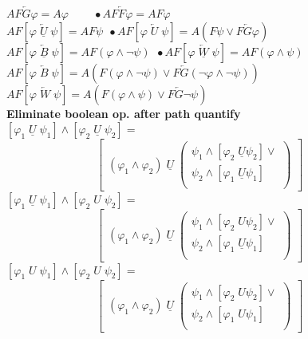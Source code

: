 \documentclass{article}
\begin{document}
\begin{multicols}{4}
$ A F \overleftarrow{G} \varphi  = A \varphi\ \ \ \ \ \ \ \ \ \ \bullet A F \overleftarrow{F} \varphi = AF \varphi $\\
$ A F[\varphi \; \underline{\overleftarrow{U}}\; \psi] = AF \psi\ \ \bullet A F[\varphi \; \overleftarrow{U}\; \psi] = A( F \psi \vee  F \overleftarrow{G} \varphi )$\\
$ A F[\varphi \; \underline{\overleftarrow{B}}\; \psi] = AF(\varphi \wedge \neg \psi)\ \ \bullet A F[\varphi \; \underline{\overleftarrow{W}}\; \psi] = AF(\varphi \wedge \psi)    $\\
$ A F[\varphi \; \overleftarrow{B}\; \psi]  = A ( F(\varphi \wedge \neg \psi)  \vee  F \overleftarrow{G} (\neg \varphi \wedge \neg \psi) )$\\
$ A F[\varphi \; \overleftarrow{W}\; \psi]  =  A(F(\varphi \wedge \psi) \vee  F \overleftarrow{G} \neg \psi )$\\

\textbf{Eliminate boolean op. after path quantify}\\
$[\varphi_1\; \underline{U}\; \psi_1] \wedge [\varphi_2\; \underline{U}\; \psi_2] =$\\
$\qquad\qquad\qquad\qquad\begin{bmatrix}
  (\varphi_1 \wedge \varphi_2) \; \underline{U} \; 
  	\begin{pmatrix}
  		\psi_1 \wedge [\varphi_2 \; \underline{U} \psi_2] \vee \\
  		\psi_2 \wedge [\varphi_1 \; \underline{U} \psi_1]\;\;\\
	\end{pmatrix}
  \end{bmatrix}$
$[\varphi_1\; \underline{U}\; \psi_1] \wedge [\varphi_2\; U\; \psi_2] =$\\
$\qquad\qquad\qquad\qquad\begin{bmatrix}
  (\varphi_1 \wedge \varphi_2) \; \underline{U} \; 
  	\begin{pmatrix}
  		\psi_1 \wedge [\varphi_2 \; U \psi_2] \vee \\
  		\psi_2 \wedge [\varphi_1 \; \underline{U} \psi_1]\;\;\\
	\end{pmatrix}
  \end{bmatrix}$
$[\varphi_1\; U\; \psi_1] \wedge [\varphi_2\; U\; \psi_2] =$\\
$\qquad\qquad\qquad\qquad\begin{bmatrix}
  (\varphi_1 \wedge \varphi_2) \; \underline{U} \; 
  	\begin{pmatrix}
  		\psi_1 \wedge [\varphi_2 \; U \psi_2] \vee \\
  		\psi_2 \wedge [\varphi_1 \; U \psi_1]\;\;\\
	\end{pmatrix}
  \end{bmatrix}$


\end{multicols}
\end{document}
